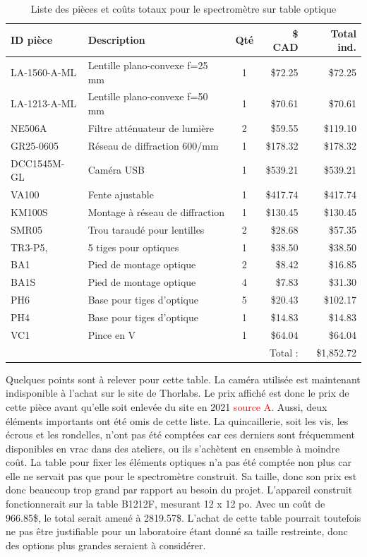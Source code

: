 \documentclass[11pt,letterpaper]{article}
\begin{document}
\begin{table}[!ht]
    \centering
    \caption{Liste des pièces et coûts totaux pour le spectromètre sur table optique}
    \begin{tabular}{|l|l|c|r|r|}
    \hline
        ID pièce & Description & Qté & \$ CAD & Total ind. \\ \hline\hline
        LA-1560-A-ML & Lentille plano-convexe f=25 mm & 1 & \$72.25 & \$72.25 \\ \hline
        LA-1213-A-ML & Lentille plano-convexe f=50 mm & 1 & \$70.61 & \$70.61 \\ \hline
        NE506A & Filtre atténuateur de lumière & 2 & \$59.55 & \$119.10 \\ \hline
        GR25-0605 & Réseau de diffraction 600/mm & 1 & \$178.32 & \$178.32 \\ \hline
        DCC1545M-GL & Caméra USB & 1 & \$539.21 & \$539.21 \\ \hline
        VA100 & Fente ajustable & 1 & \$417.74 & \$417.74 \\ \hline
        KM100S & Montage à réseau de diffraction & 1 & \$130.45 & \$130.45 \\ \hline
        SMR05 & Trou taraudé pour lentilles & 2 & \$28.68 & \$57.35 \\ \hline
        TR3-P5, & 5 tiges pour optiques & 1 & \$38.50 & \$38.50 \\ \hline
        BA1 & Pied de montage optique & 2 & \$8.42 & \$16.85 \\ \hline
        BA1S & Pied de montage optique & 4 & \$7.83 & \$31.30 \\ \hline
        PH6 & Base pour tiges d'optique & 5 & \$20.43 & \$102.17 \\ \hline
        PH4 & Base pour tiges d'optique & 1 & \$14.83 & \$14.83 \\ \hline
        VC1 & Pince en V & 1 & \$64.04 & \$64.04 \\ \hline\hline
        ~ & ~ & ~ & Total : & \$1,852.72 \\ \hline
    \end{tabular}
    \label{prix_table}
\end{table}

Quelques points sont à relever pour cette table. La caméra utilisée est maintenant indisponible
à l'achat sur le site de Thorlabs. Le prix affiché est donc le prix de cette pièce avant
qu'elle soit enlevée du site en 2021 \textcolor{red}{source A}. Aussi, deux éléments importants
ont été omis de cette liste. La quincaillerie, soit les vis, les écrous et les 
rondelles, n'ont pas été comptées car ces derniers sont fréquemment disponibles en vrac dans
des ateliers, ou ils s'achètent en ensemble à moindre coût. La table pour fixer les éléments 
optiques n'a pas été comptée non plus car elle ne servait pas que pour le spectromètre 
construit. Sa taille, donc son prix est donc beaucoup trop grand par rapport au besoin du projet. L'appareil
construit fonctionnerait sur la table B1212F, mesurant 12 x 12 po. Avec un coût de 966.85\$,
le total serait amené à 2819.57\$. L'achat de cette table pourrait toutefois ne pas être 
justifiable pour un laboratoire étant donné sa taille restreinte, donc des options plus grandes
seraient à considérer.
\end{document}
